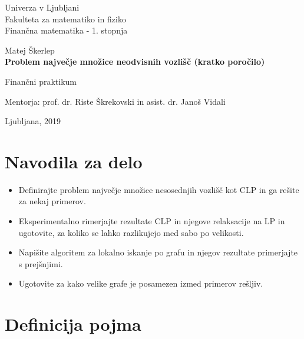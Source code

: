 \documentclass[a4paper, 12 pt]{article}
\theoremstyle{plain}
\theoremstyle{definition}
\begin{document}
\begin{titlepage}
		\begin{center}
		
		\large
		Univerza v Ljubljani\\
		\normalsize
		Fakulteta za matematiko in fiziko\\
		
		\small
		Finančna matematika - 1. stopnja\\
		
		\vspace{5 cm} 
		
		\large
		Matej Škerlep \\
		
		\vspace{0.5cm}
		\Large
		\textbf{Problem največje množice neodvisnih vozlišč (kratko poročilo)}
		
		\vspace{0.5 cm}
		\normalsize
		Finančni praktikum
		
		\vspace{1.5cm}
		\normalsize
		Mentorja: prof. dr. Riste Škrekovski in asist. dr. Janoš Vidali
		
		\vfill
		
		\large Ljubljana, 2019
		
		\end{center}
\end{titlepage}


\section{Navodila za delo}
\begin{itemize}
\item Definirajte problem največje množice nesosednjih vozlišč kot CLP in ga rešite za nekaj primerov. 
\item Eksperimentalno rimerjajte rezultate CLP in njegove relaksacije na LP in ugotovite, za koliko se lahko razlikujejo med sabo po velikosti.
\item Napišite algoritem za lokalno iskanje po grafu in njegov rezultate primerjajte s prejšnjimi. 
\item Ugotovite za kako velike grafe je posamezen izmed primerov rešljiv.
\end{itemize}

\section{Definicija pojma}
\end{document}

